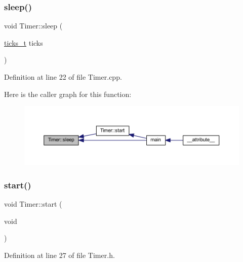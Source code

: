 \subsubsection{\texorpdfstring{sleep()}{sleep()}}
{\footnotesize\ttfamily void Timer\+::sleep (\begin{DoxyParamCaption}\item[{\hyperlink{class_timer_af064c6652d9c7424aa2a69091077371d}{ticks\+\_\+t}}]{ticks }\end{DoxyParamCaption})\hspace{0.3cm}{\ttfamily [static]}}



Definition at line 22 of file Timer.\+cpp.

Here is the caller graph for this function\+:
\nopagebreak
\begin{figure}[H]
\begin{center}
\leavevmode
\includegraphics[width=350pt]{class_timer_ad946179cf9404a33927ec3d33ed270d7_icgraph}
\end{center}
\end{figure}
\mbox{\label{class_timer_abb13e798f6d89b09fdc9182d64c7558b}} 
\subsubsection{\texorpdfstring{start()}{start()}}
{\footnotesize\ttfamily void Timer\+::start (\begin{DoxyParamCaption}\item[{void}]{ }\end{DoxyParamCaption})\hspace{0.3cm}{\ttfamily [inline]}}



Definition at line 27 of file Timer.\+h.

